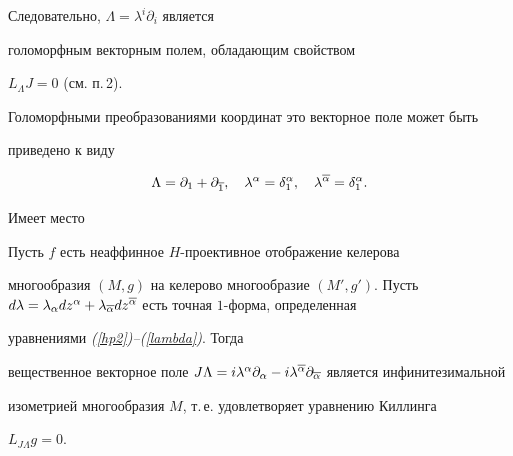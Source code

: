 Следовательно, $\Lambda = \lambda^i \partial_i$ является


голоморфным векторным полем, обладающим свойством


$L_\Lambda J=0$ (см. п.\,2).


Голоморфными преобразованиями координат это векторное поле может быть


приведено к виду


\begin{equation}


\label{hol-form}


\Lambda = \pl1 +\pl{\ol 1}, \quad


\lambda^\alpha = \delta^\alpha_1, \quad


\lambda^{\ol\alpha} = \delta^\alpha_1.


\end{equation}


Имеет место





\begin{thm}\label{sh-th1}


Пусть $f$ есть неаффинное $H$-проективное отображение келерова


многообразия $(M,g)$ на келерово многообразие $(M',g')$. Пусть $d\lambda =


\lambda_{\alpha} dz^\alpha+


\lambda_{\ol\alpha} dz^{\ol\alpha}$ есть точная $1$-форма, определенная


уравнениями {\em(\ref{hp2})--(\ref{lambda})}. Тогда


вещественное векторное поле $J\Lambda = i\lambda^{\alpha} \pl\alpha -


i\lambda^{\ol\alpha} \pl{\ol\alpha}$ является инфинитезимальной


изометрией многообразия $M$, т.\,е. удовлетворяет уравнению Киллинга


$L_{J\Lambda} g =0$.


\end{thm}





